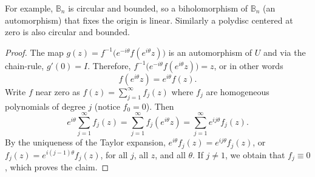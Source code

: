 \documentclass[12pt,openany]{book}
\newcommand{\bB}{{\mathbb{B}}}
\theoremstyle{plain}
\theoremstyle{remark}
\theoremstyle{definition}
\theoremstyle{exercise}
\theoremstyle{example}
\begin{document}
For example, $\bB_n$ is circular and bounded, so a biholomorphism of $\bB_n$
(an automorphism)
that fixes the origin is linear.  Similarly a polydisc centered at zero is
also circular and bounded.

\begin{proof}
The map $g(z) = f^{-1}\bigl(e^{-i\theta}f(e^{i\theta} z)\bigr)$ is an
automorphism of $U$ and via the
chain-rule, $g'(0) = I$.  Therefore,
$f^{-1}\bigl(e^{-i\theta}f(e^{i\theta} z)\bigr) = z$, or in other words
\begin{equation*}
f(e^{i\theta} z) = e^{i\theta}f(z) .
\end{equation*}
Write $f$ near zero as $f(z) = \sum_{j=1}^\infty f_j(z)$ where $f_j$ are
homogeneous polynomials of degree $j$ (notice $f_0 = 0$).  Then
\begin{equation*}
e^{i\theta} \sum_{j=1}^\infty f_j(z) 
=
\sum_{j=1}^\infty f_j(e^{i\theta} z)
=
\sum_{j=1}^\infty e^{ij\theta}f_j(z) .
\end{equation*}
By the uniqueness of the Taylor expansion, 
$e^{i\theta} f_j(z)  = e^{ij\theta} f_j(z)$, or
$f_j(z)  = e^{i(j-1)\theta} f_j(z)$,
for all $j$, all $z$, and all $\theta$.
If $j\not=1$, we obtain that $f_j \equiv
0$, which proves the claim.
\end{proof}
\end{document}
